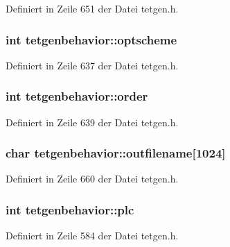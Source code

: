 Definiert in Zeile 651 der Datei tetgen.\-h.

\hypertarget{classtetgenbehavior_a4e5be08acac6b661a03e57efedd83ac9}{
\subsubsection[{optscheme}]{\setlength{\rightskip}{0pt plus 5cm}int tetgenbehavior\-::optscheme}}\label{classtetgenbehavior_a4e5be08acac6b661a03e57efedd83ac9}


Definiert in Zeile 637 der Datei tetgen.\-h.

\hypertarget{classtetgenbehavior_a47550f681968e6674f3c78b395d59df8}{
\subsubsection[{order}]{\setlength{\rightskip}{0pt plus 5cm}int tetgenbehavior\-::order}}\label{classtetgenbehavior_a47550f681968e6674f3c78b395d59df8}


Definiert in Zeile 639 der Datei tetgen.\-h.

\hypertarget{classtetgenbehavior_aa066e0b8f2b5b3d0f9e5c6b74e8eadc4}{
\subsubsection[{outfilename}]{\setlength{\rightskip}{0pt plus 5cm}char tetgenbehavior\-::outfilename\mbox{[}1024\mbox{]}}}\label{classtetgenbehavior_aa066e0b8f2b5b3d0f9e5c6b74e8eadc4}


Definiert in Zeile 660 der Datei tetgen.\-h.

\hypertarget{classtetgenbehavior_a40797ab5b2da5eeb579c6bdfe18b15af}{
\subsubsection[{plc}]{\setlength{\rightskip}{0pt plus 5cm}int tetgenbehavior\-::plc}}\label{classtetgenbehavior_a40797ab5b2da5eeb579c6bdfe18b15af}


Definiert in Zeile 584 der Datei tetgen.\-h.

